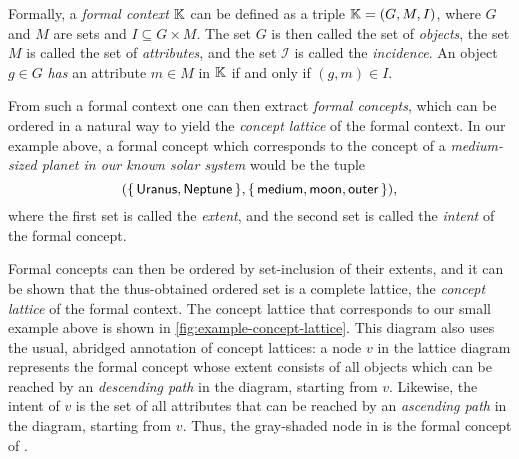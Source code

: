 Formally, a \emph{formal context} ${\mathbb{K}}$ can be defined as a triple ${\mathbb{K}} = (G, M,
I)$, where $G$ and $M$ are sets and $I \subseteq G \times M$.  The set $G$ is then called
the set of \emph{objects}, the set $M$ is called the set of \emph{attributes}, and the set
$\mathcal{I}$ is called the \emph{incidence}.  An object $g \in G$ \emph{has} an attribute
$m \in M$ in ${\mathbb{K}}$ if and only if $(g, m) \in I$.

From such a formal context one can then extract \emph{formal concepts}, which can be
ordered in a natural way to yield the \emph{concept lattice} of the formal context.  In
our example above, a formal concept which corresponds to the concept of a
\emph{medium-sized planet in our known solar system} would be the tuple
\begin{equation}
  \label{eq:60}
  ( {\{\, \mathsf{Uranus}, \mathsf{Neptune} \,\}}, {\{\, \mathsf{medium}, \mathsf{moon},
    \mathsf{outer} \,\}} ),
\end{equation}
where the first set is called the \emph{extent}, and the second set is called the
\emph{intent} of the formal concept.

Formal concepts can then be ordered by set-inclusion of their extents, and it can be shown
that the thus-obtained ordered set is a complete lattice, the \emph{concept lattice} of
the formal context.  The concept lattice that corresponds to our small example above is
shown in \ref{fig:example-concept-lattice}.  This diagram also uses the usual, abridged
annotation of concept lattices: a node $v$ in the lattice diagram represents the formal
concept whose extent consists of all objects which can be reached by an \emph{descending
  path} in the diagram, starting from $v$.  Likewise, the intent of $v$ is the set of all
attributes that can be reached by an \emph{ascending path} in the diagram, starting from
$v$.  Thus, the gray-shaded node in  is the formal
concept of .

